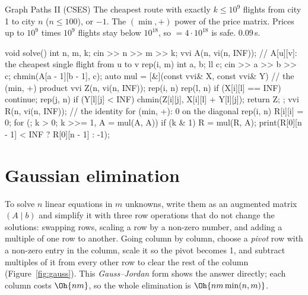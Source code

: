 \begin{problem}{Graph Paths II (CSES)}
The cheapest route with exactly $k \le 10^9$ flights from city 1 to city $n$ ($n \le 100$), or $-1$.
\solution The $(\min, +)$ power of the price matrix. Prices up to $10^9$ times $10^9$ flights stay below $10^{18}$, so 
$= 4 \cdot 10^{18}$ is safe. 0.09\,s.
\end{problem}

\begin{code}
void solve() {
    int n, m, k;
    cin >> n >> m >> k;
    vvi A(n, vi(n, INF));  // A[u][v]: the cheapest single flight from u to v
    rep(i, m) {
        int a, b;
        ll c;
        cin >> a >> b >> c;
        chmin(A[a - 1][b - 1], c);
    }
    auto mul = [&](const vvi& X, const vvi& Y) {  // the (min, +) product
        vvi Z(n, vi(n, INF));
        rep(i, n) rep(l, n) {
            if (X[i][l] == INF) continue;
            rep(j, n) if (Y[l][j] < INF) chmin(Z[i][j], X[i][l] + Y[l][j]);
        }
        return Z;
    };
    vvi R(n, vi(n, INF));  // the identity for (min, +): 0 on the diagonal
    rep(i, n) R[i][i] = 0;
    for (; k > 0; k >>= 1, A = mul(A, A))
        if (k & 1) R = mul(R, A);
    print(R[0][n - 1] < INF ? R[0][n - 1] : -1);
}
\end{code}

\section[Gaussian elimination]{Gaussian elimination \hfill \plat}\label{sec:gauss}

To solve $n$ linear equations in $m$ unknowns, write them as an augmented matrix $(A \mid b)$ and simplify it with three row operations
that do not change the solutions: swapping rows, scaling a row by a non-zero number, and adding a multiple of one row to another. Going
column by column, choose a \emph{pivot} row with a non-zero entry in the column, scale it so the pivot becomes 1, and subtract multiples
of it from every other row to clear the rest of the column (Figure~\ref{fig:gauss}). This \emph{Gauss--Jordan} form shows the answer
directly; each column costs $\Oh{nm}$, so the whole elimination is $\Oh{nm \min(n, m)}$.

